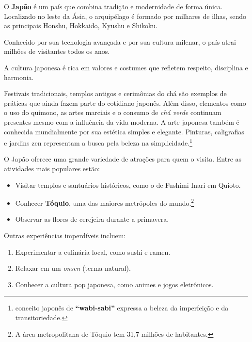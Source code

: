 \documentclass{article}
\begin{document}
O \textbf{Japão} é um país que combina tradição e modernidade de forma única. Localizado no leste da Ásia, o arquipélago é formado por milhares de ilhas, sendo as principais Honshu, Hokkaido, Kyushu e Shikoku.

Conhecido por sua tecnologia avançada e por sua cultura milenar, o país atrai milhões de visitantes todos os anos.

A cultura japonesa é rica em valores e costumes que refletem respeito, disciplina e harmonia.

Festivais tradicionais, templos antigos e cerimônias do chá são exemplos de práticas que ainda fazem parte do cotidiano japonês.
Além disso, elementos como o uso do quimono, as artes marciais e o consumo de \textit{chá verde} continuam presentes mesmo com a influência da vida moderna.
A arte japonesa também é conhecida mundialmente por sua estética simples e elegante. Pinturas, caligrafias e jardins zen representam a busca pela beleza na simplicidade.\footnote{conceito japonês de \textbf{“wabi-sabi”} expressa a beleza da imperfeição e da transitoriedade.} %

O Japão oferece uma grande variedade de atrações para quem o visita.
Entre as atividades mais populares estão:
\begin{itemize}
    \item{Visitar templos e santuários históricos, como o de Fushimi Inari em Quioto.}
    \item{Conhecer \textbf{Tóquio}, uma das maiores metrópoles do mundo.\footnote{A área metropolitana de Tóquio tem 31,7 milhões de habitantes.}}
    \item{Observar as flores de cerejeira durante a primavera.}
\end{itemize}
    

Outras experiências imperdíveis incluem:
\begin{enumerate}
    \item{Experimentar a culinária local, como sushi e ramen.}
    \item{Relaxar em um \textit{onsen} (terma natural).}
    \item{Conhecer a cultura pop japonesa, como animes e jogos eletrônicos.}
\end{enumerate}    
\end{document}
